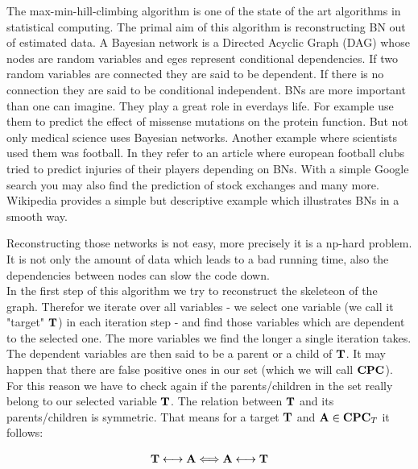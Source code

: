 The max-min-hill-climbing algorithm is one of the state of the art algorithms in statistical computing. The primal aim of this algorithm is reconstructing BN out of estimated data. A Bayesian network is a Directed Acyclic Graph (DAG) whose nodes are random variables and eges represent conditional dependencies. If two random variables are connected they are said to be dependent. If there is no connection they are said to be conditional independent. BNs are more important than one can imagine. They play a great role in everdays life. For example \cite{NBBCW} use them to predict the effect of missense mutations on the protein function. But not only medical science uses Bayesian networks. Another example where scientists used them was football. In \cite{PKA} they refer to an article where european football clubs tried to predict injuries of their players depending on BNs. With a simple Google search you may also find the prediction of stock exchanges and many more. Wikipedia provides a simple but descriptive example which illustrates BNs in a smooth way.


Reconstructing those networks is not easy, more precisely it is a np-hard problem. It is not only the amount of data which leads to a bad running time, also the dependencies between nodes can slow the code down.\\
In the first step of this algorithm we try to reconstruct the skeleteon of the graph. Therefor we iterate over all variables - we select one variable (we call it "target" ${\textbf{T}}$) in each iteration step - and find those variables which are dependent to the selected one. The more variables we find the longer a single iteration takes. The dependent variables are then said to be a parent or a child of ${\textbf{T}}$. It may happen that there are false positive ones in our set (which we will call ${\textbf{CPC}}$). For this reason we have to check again if the parents/children in the set really belong to our selected variable ${\textbf{T}}$. The relation between ${\textbf{T}}$ and its parents/children is symmetric. That means for a target ${\textbf{T}}$ and ${\textbf{A}} \in {\textbf{CPC}}_{T}$ it follows:

\begin{equation}
	{\textbf{T}} \longleftrightarrow {\textbf{A}} \Longleftrightarrow {\textbf{A}} \longleftrightarrow {\textbf{T}} \label{eq.symmetric}
\end{equation}

